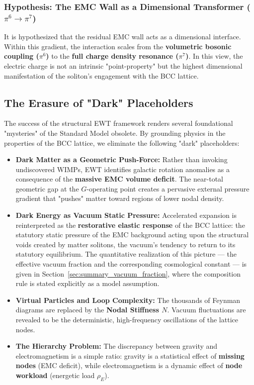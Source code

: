 \documentclass[10pt,a4paper]{article}
\begin{document}
\subsubsection*{Hypothesis: The EMC Wall as a Dimensional Transformer ($\pi^6 \to \pi^7$)}
It is hypothesized that the residual EMC wall acts as a dimensional interface. Within this gradient, the interaction scales from the \textbf{volumetric bosonic coupling ($\pi^6$)} to the \textbf{full charge density resonance ($\pi^7$)}. In this view, the electric charge is not an intrinsic "point-property" but the highest dimensional manifestation of the soliton's engagement with the BCC lattice.

\subsection{The Erasure of "Dark" Placeholders}

The success of the structural EWT framework renders several foundational "mysteries" of the Standard Model obsolete. By grounding physics in the properties of the BCC lattice, we eliminate the following "dark" placeholders:

\begin{itemize}
	\item \textbf{Dark Matter as a Geometric Push-Force:} Rather than invoking undiscovered WIMPs, EWT identifies galactic rotation anomalies as a consequence of the \textbf{massive EMC volume deficit}. The near-total geometric gap at the $G$-operating point creates a pervasive external pressure gradient that "pushes" matter toward regions of lower nodal density.
	
	\item \textbf{Dark Energy as Vacuum Static Pressure:} Accelerated
	expansion is reinterpreted as the \textbf{restorative elastic
		response} of the BCC lattice: the statutory static pressure of the
	EMC background acting upon the structural voids created by matter
	solitons, the vacuum's tendency to return to its statutory
	equilibrium. The quantitative realization of this picture --- the
	effective vacuum fraction and the corresponding cosmological
	constant --- is given in
	Section~\ref{sec:summary_vacuum_fraction}, where the composition
	rule is stated explicitly as a model assumption.
		
	\item \textbf{Virtual Particles and Loop Complexity:} The thousands of Feynman diagrams are replaced by the \textbf{Nodal Stiffness $N$}. Vacuum fluctuations are revealed to be the deterministic, high-frequency oscillations of the lattice nodes.
	
	\item \textbf{The Hierarchy Problem:} The discrepancy between gravity and electromagnetism is a simple ratio: gravity is a statistical effect of \textbf{missing nodes} (EMC deficit), while electromagnetism is a dynamic effect of \textbf{node workload} (energetic load $\rho_E$).
\end{itemize}
\end{document}
